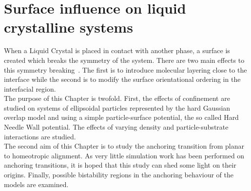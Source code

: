 

\chapter{Surface influence on liquid crystalline systems}
\label{chap:four}

\introduction

When a Liquid Crystal is placed in contact with another phase, a surface is created which breaks
the symmetry of the system. There are two main effects to this symmetry breaking~\cite{Jerome91}.
The first is to introduce molecular layering close to the interface while the second  is to 
modify the surface orientational ordering in the interfacial region.\\
The purpose of this Chapter is twofold. First, the effects of confinement are studied on systems of
ellipsoidal particles represented by the hard Gaussian overlap model and using a simple 
particle-surface potential, the so called Hard Needle Wall potential. The effects of varying
density and particle-substrate interactions are studied.\\
The second aim of this Chapter is to study the anchoring transition from planar to homeotropic
alignment. As very little simulation work has been performed on anchoring transitions, it is
hoped that this study can shed some light on their origins. Finally, possible
bistability regions in the anchoring behaviour of the models are examined.









\conclusion

